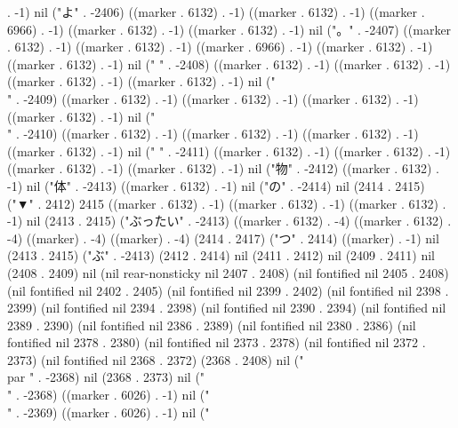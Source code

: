 . -1) nil ("よ" . -2406) ((marker . 6132) . -1) ((marker . 6132) . -1) ((marker . 6966) . -1) ((marker . 6132) . -1) ((marker . 6132) . -1) nil ("。" . -2407) ((marker . 6132) . -1) ((marker . 6132) . -1) ((marker . 6966) . -1) ((marker . 6132) . -1) ((marker . 6132) . -1) nil ("
" . -2408) ((marker . 6132) . -1) ((marker . 6132) . -1) ((marker . 6132) . -1) ((marker . 6132) . -1) nil ("\\" . -2409) ((marker . 6132) . -1) ((marker . 6132) . -1) ((marker . 6132) . -1) ((marker . 6132) . -1) nil ("\\" . -2410) ((marker . 6132) . -1) ((marker . 6132) . -1) ((marker . 6132) . -1) ((marker . 6132) . -1) nil ("
" . -2411) ((marker . 6132) . -1) ((marker . 6132) . -1) ((marker . 6132) . -1) ((marker . 6132) . -1) nil ("物" . -2412) ((marker . 6132) . -1) nil ("体" . -2413) ((marker . 6132) . -1) nil ("の" . -2414) nil (2414 . 2415) ("▼" . 2412) 2415 ((marker . 6132) . -1) ((marker . 6132) . -1) ((marker . 6132) . -1) nil (2413 . 2415) ("ぶったい" . -2413) ((marker . 6132) . -4) ((marker . 6132) . -4) ((marker) . -4) ((marker) . -4) (2414 . 2417) ("つ" . 2414) ((marker) . -1) nil (2413 . 2415) ("ぶ" . -2413) (2412 . 2414) nil (2411 . 2412) nil (2409 . 2411) nil (2408 . 2409) nil (nil rear-nonsticky nil 2407 . 2408) (nil fontified nil 2405 . 2408) (nil fontified nil 2402 . 2405) (nil fontified nil 2399 . 2402) (nil fontified nil 2398 . 2399) (nil fontified nil 2394 . 2398) (nil fontified nil 2390 . 2394) (nil fontified nil 2389 . 2390) (nil fontified nil 2386 . 2389) (nil fontified nil 2380 . 2386) (nil fontified nil 2378 . 2380) (nil fontified nil 2373 . 2378) (nil fontified nil 2372 . 2373) (nil fontified nil 2368 . 2372) (2368 . 2408) nil ("\\par " . -2368) nil (2368 . 2373) nil ("\\" . -2368) ((marker . 6026) . -1) nil ("\\" . -2369) ((marker . 6026) . -1) nil ("
